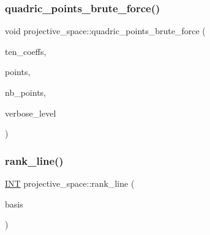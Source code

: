 \mbox{\label{classprojective__space_af86e94e537f6a36d08b546152178687e}} 
\subsubsection{\texorpdfstring{quadric\+\_\+points\+\_\+brute\+\_\+force()}{quadric\_points\_brute\_force()}}
{\footnotesize\ttfamily void projective\+\_\+space\+::quadric\+\_\+points\+\_\+brute\+\_\+force (\begin{DoxyParamCaption}\item[{\mbox{\hyperlink{galois_8h_a09fddde158a3a20bd2dcadb609de11dc}{I\+NT}} $\ast$}]{ten\+\_\+coeffs,  }\item[{\mbox{\hyperlink{galois_8h_a09fddde158a3a20bd2dcadb609de11dc}{I\+NT}} $\ast$}]{points,  }\item[{\mbox{\hyperlink{galois_8h_a09fddde158a3a20bd2dcadb609de11dc}{I\+NT}} \&}]{nb\+\_\+points,  }\item[{\mbox{\hyperlink{galois_8h_a09fddde158a3a20bd2dcadb609de11dc}{I\+NT}}}]{verbose\+\_\+level }\end{DoxyParamCaption})}

\mbox{\label{classprojective__space_a13922a8a1d53b619956470bd7e0b04ab}} 
\subsubsection{\texorpdfstring{rank\+\_\+line()}{rank\_line()}}
{\footnotesize\ttfamily \mbox{\hyperlink{galois_8h_a09fddde158a3a20bd2dcadb609de11dc}{I\+NT}} projective\+\_\+space\+::rank\+\_\+line (\begin{DoxyParamCaption}\item[{\mbox{\hyperlink{galois_8h_a09fddde158a3a20bd2dcadb609de11dc}{I\+NT}} $\ast$}]{basis }\end{DoxyParamCaption})}

\mbox{\label{classprojective__space_a176d8dc08b2874862320e79109005acd}} 
